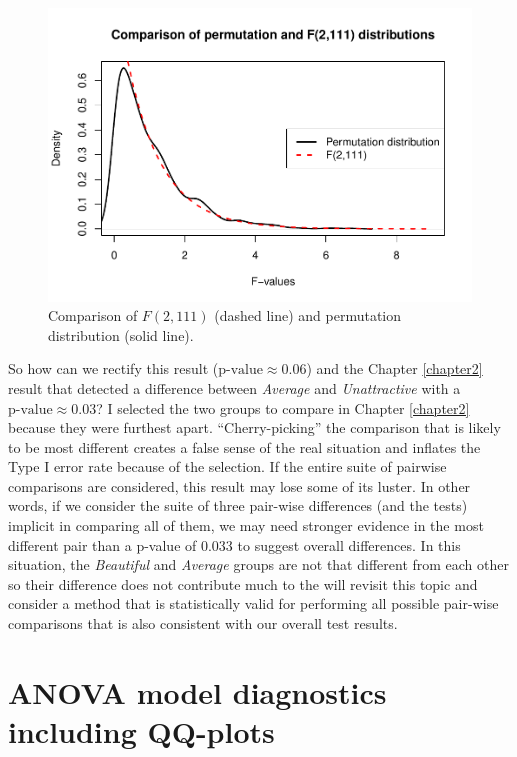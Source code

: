 \documentclass[]{book}
\begin{document}
\begin{figure}
\centering
\includegraphics{GreenwoodBanner_files/figure-latex/Figure3-8-1.pdf}
\caption{\label{fig:Figure3-8}Comparison of \(F(2, 111)\) (dashed line) and permutation
distribution (solid line).}
\end{figure}

So how can we rectify this result (\(\text{p-value}\approx 0.06\)) and
the Chapter \ref{chapter2} result that detected a difference between
\emph{Average} and \emph{Unattractive} with a
\(\text{p-value}\approx 0.03\)? I selected the two groups to compare in
Chapter \ref{chapter2} because they were furthest apart.
``Cherry-picking'' the comparison that is likely to be most different
creates a false sense of the real situation and inflates the Type I
error rate because of the selection. If the entire suite of pairwise
comparisons are considered, this result may lose some of its luster. In
other words, if we consider the suite of three pair-wise differences
(and the tests) implicit in comparing all of them, we may need stronger
evidence in the most different pair than a p-value of 0.033 to suggest
overall differences. In this situation, the \emph{Beautiful} and
\emph{Average} groups are not that different from each other so their
difference does not contribute much to the will revisit this topic and
consider a method that is statistically valid for performing all
possible pair-wise comparisons that is also consistent with our overall
test results.

\section{ANOVA model diagnostics including QQ-plots}\label{section3-4}
\end{document}
